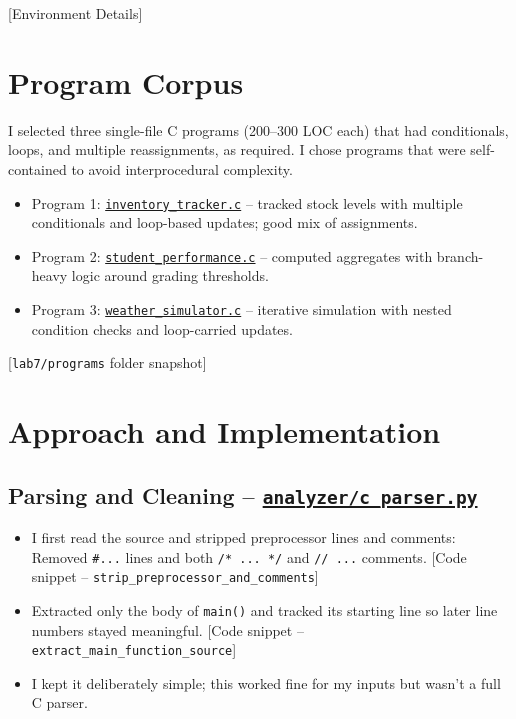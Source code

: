 \documentclass[10pt,a4paper]{report}
\begin{document}
[Environment Details]

\section{Program Corpus}

I selected three single-file C programs (200--300 LOC each) that had conditionals, loops, and multiple reassignments, as required. I chose programs that were self-contained to avoid interprocedural complexity.

\begin{itemize}[itemsep=0em, topsep=0pt]
    \item Program 1: \href{https://github.com/ShardulJunagade/cs202-stt/tree/main/lab7/programs/inventory_tracker.c}{\texttt{inventory\_tracker.c}} -- tracked stock levels with multiple conditionals and loop-based updates; good mix of assignments.
    \item Program 2: \href{https://github.com/ShardulJunagade/cs202-stt/tree/main/lab7/programs/student_performance.c}{\texttt{student\_performance.c}} -- computed aggregates with branch-heavy logic around grading thresholds.
    \item Program 3: \href{https://github.com/ShardulJunagade/cs202-stt/tree/main/lab7/programs/weather_simulator.c}{\texttt{weather\_simulator.c}} -- iterative simulation with nested condition checks and loop-carried updates.
\end{itemize}

[\texttt{lab7/programs} folder snapshot]

\section{Approach and Implementation}

\subsection{Parsing and Cleaning -- \href{https://github.com/ShardulJunagade/cs202-stt/tree/main/lab7/analyzer/c_parser.py}{\texttt{analyzer/c\_parser.py}}}
\begin{itemize}[itemsep=0em, topsep=0pt]
    \item I first read the source and stripped preprocessor lines and comments:
    Removed \texttt{\#...} lines and both \texttt{/* ... */} and \texttt{// ...} comments.
    [Code snippet -- \texttt{strip\_preprocessor\_and\_comments}]
    \item Extracted only the body of \texttt{main()} and tracked its starting line so later line numbers stayed meaningful.
    [Code snippet -- \texttt{extract\_main\_function\_source}]
    \item I kept it deliberately simple; this worked fine for my inputs but wasn’t a full C parser.
\end{itemize}
\end{document}
